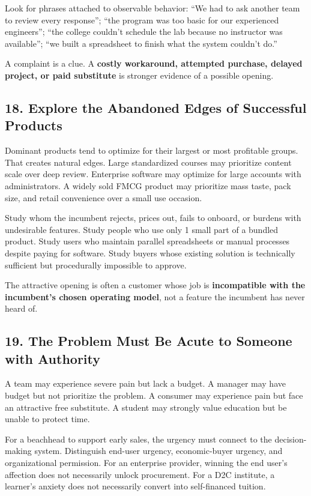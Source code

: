 Look for phrases attached to observable behavior: ``We had to ask another team to review every response''; ``the program was too basic for our experienced engineers''; ``the college couldn't schedule the lab because no instructor was available''; ``we built a spreadsheet to finish what the system couldn't do.''

A complaint is a clue. A \textbf{costly workaround, attempted purchase, delayed project, or paid substitute} is stronger evidence of a possible opening.

\subsection*{18. Explore the Abandoned Edges of Successful Products}

Dominant products tend to optimize for their largest or most profitable groups. That creates natural edges. Large standardized courses may prioritize content scale over deep review. Enterprise software may optimize for large accounts with administrators. A widely sold FMCG product may prioritize mass taste, pack size, and retail convenience over a small use occasion.

Study whom the incumbent rejects, prices out, fails to onboard, or burdens with undesirable features. Study people who use only 1 small part of a bundled product. Study users who maintain parallel spreadsheets or manual processes despite paying for software. Study buyers whose existing solution is technically sufficient but procedurally impossible to approve.

The attractive opening is often a customer whose job is \textbf{incompatible with the incumbent's chosen operating model}, not a feature the incumbent has never heard of.

\subsection*{19. The Problem Must Be Acute to Someone with Authority}

A team may experience severe pain but lack a budget. A manager may have budget but not prioritize the problem. A consumer may experience pain but face an attractive free substitute. A student may strongly value education but be unable to protect time.

For a beachhead to support early sales, the urgency must connect to the decision-making system. Distinguish end-user urgency, economic-buyer urgency, and organizational permission. For an enterprise provider, winning the end user's affection does not necessarily unlock procurement. For a D2C institute, a learner's anxiety does not necessarily convert into self-financed tuition.

